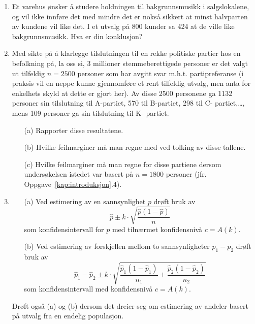 \begin{enumerate}
\item Et varehus ønsker å studere holdningen til
bakgrunnsmusikk i salgslokalene, og vil ikke innføre det med mindre
det er nokså sikkert at minst halvparten av kundene vil like det.
I et utvalg på 800 kunder sa 424 at de ville like
bakgrunnsmusikk.  Hva er din konklusjon?

\item Med sikte på å klarlegge tilslutningen til en rekke
politiske partier hos en befolkning på, la oss si, 3
millioner stemmeberettigede personer er det valgt ut
tilfeldig $n=2500$ personer som har avgitt svar m.h.t.
partipreferanse (i praksis vil en neppe kunne gjennomføre et
rent tilfeldig utvalg, men anta for enkelhets skyld at dette
er gjort her). Av disse 2500 personene ga 1132 personer sin
tilslutning til A-partiet, 570 til B-partiet, 298 til C-
partiet,\ldots , mens 109 personer ga sin tilslutning til K-
partiet.
\begin{itemize}
\item[(a)] Rapporter disse resultatene.
\item[(b)] Hvilke feilmarginer må man regne med ved tolking av
   disse tallene.
\item[(c)] Hvilke feilmarginer må man regne for disse partiene
   dersom undersøkelsen istedet var basert på $n=1800$ personer (jfr. Oppgave~\ref*{kap:introduksjon}.4).
\end{itemize}

\item 
\begin{itemize}
\item[(a)] Ved estimering av en sannsynlighet $p$ drøft bruk av
\[ \hat{p} \pm 
      k \cdot \sqrt{\frac{\hat{p}(1-\hat{p})}{n}} \]
som konfidensintervall for $p$ med tilnærmet konfidensnivå $c=A(k)$.
\item[(b)] Ved estimering av forskjellen mellom to sannsynligheter $p_1- p_2$
drøft bruk av
\[ \hat{p}_1 - \hat{p}_2 \pm
      k \cdot \sqrt{\frac{\hat{p}_1(1-\hat{p}_1)}{n_1}
             +   \frac{\hat{p}_2(1-\hat{p}_2)}{n_2}} \]
som konfidensintervall med konfidensnivå $c=A(k)$.
\end{itemize}
Drøft også (a) og (b) dersom det dreier seg om estimering av
andeler basert på utvalg fra en endelig populasjon.


\end{enumerate}
